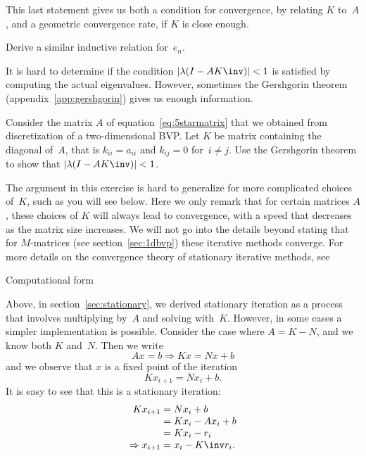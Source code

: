 This last statement gives us both a condition for convergence, by
relating $K$ to~$A$, and a geometric convergence rate, if $K$ is
close enough.

\begin{exercise}
  Derive a similar inductive relation for~$e_n$. 
\end{exercise}

It is hard to determine if the condition $|\lambda(I-AK\inv)|<1$ is
satisfied by computing the actual eigenvalues. However, sometimes the
Gershgorin theorem (appendix~\ref{app:gershgorin}) gives us enough
information.

\begin{exercise}
  Consider the matrix $A$ of equation~\eqref{eq:5starmatrix} that we
  obtained from discretization of a two-dimensional \ac{BVP}. Let $K$
  be matrix containing the diagonal of~$A$, that is $k_{ii}=a_{ii}$
  and $k_{ij}=0$ for~$i\not=j$. Use the Gershgorin theorem to show
  that $|\lambda(I-AK\inv)|<1$.
\end{exercise}

The argument in this exercise is hard to generalize for more
complicated choices of~$K$, such as you will see below.
Here we only remark that for certain matrices $A$, these choices of
$K$ will always lead to convergence, with a speed that decreases as
the matrix size increases. We will not go into the details beyond
stating that for $M$-matrices (see section~\ref{sec:1dbvp}) these
iterative methods converge. For more details on the convergence theory
of stationary iterative methods, see~\cite{Varga:iterative-analysis}

 {Computational form}
\label{sec:jacobi-seidel}

Above, in section~\ref{sec:stationary}, we derived stationary
iteration as a process that involves multiplying by~$A$ and solving
with~$K$. However, in some cases a simpler implementation is
possible. Consider the case where $A=K-N$, and we know both $K$
and~$N$. Then we write
\[ Ax=b\Rightarrow Kx=Nx+b \]
and we observe that $x$ is a fixed point of the iteration
\[ Kx_{i+1}=Nx_i+b. \]
It is easy to see that this is a stationary iteration:
\[
\begin{array}{r@{{}={}}l}
  Kx_{i+1}&Nx_i+b\\ &Kx_i-Ax_i+b\\ &Kx_i-r_i\\
  \Rightarrow x_{i+1} & x_i-K\inv r_i.
\end{array}
\]

